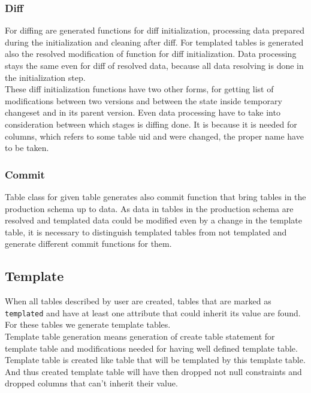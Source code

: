 \documentclass[deska]{subfiles}
\begin{document}
\subsubsection{Diff}
For diffing are generated functions for diff initialization, processing data prepared during the initialization and cleaning after diff. For templated tables is generated also the resolved modification of function for diff initialization. Data processing stays the same even for diff of resolved data, because all data resolving is done in the initialization step.\\
These diff initialization functions have two other forms, for getting list of modifications between two versions and between the state inside temporary changeset and in its parent version. Even data processing have to take into consideration between which stages is diffing done. It is because it is needed for columns, which refers to some table uid and were changed, the proper name have to be taken.

\subsubsection{Commit}
Table class for given table generates also commit function that bring tables in the production schema up to data. As data in tables in the production schema are resolved and templated data could be modified even by a change in the template table, it is necessary to distinguish templated tables from not templated and generate different commit functions for them.

\subsection{Template}
When all tables described by user are created, tables that are marked as {\tt templated} and have at least one attribute that could inherit its value are found. For these tables we generate template tables.\\
Template table generation means generation of create table statement for template table and modifications needed for having well defined template table.
Template table is created like table that will be templated by this template table. And thus created template table will have then dropped not null constraints and dropped columns that can't inherit their value.
\end{document}
